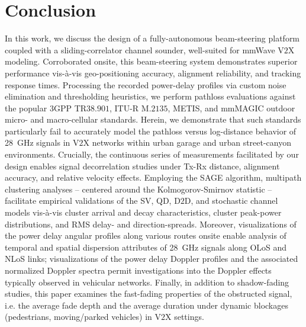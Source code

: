 \documentclass[12pt, draftcls, onecolumn]{IEEEtran}
\begin{document}
\section{Conclusion}\label{S6}
In this work, we discuss the design of a fully-autonomous beam-steering platform coupled with a sliding-correlator channel sounder, well-suited for mmWave V$2$X modeling. Corroborated onsite, this beam-steering system demonstrates superior performance vis-\`{a}-vis geo-positioning accuracy, alignment reliability, and tracking response times. Processing the recorded power-delay profiles via custom noise elimination and thresholding heuristics, we perform pathloss evaluations against the popular $3$GPP TR$38.901$, ITU-R M$.2135$, METIS, and mmMAGIC outdoor micro- and macro-cellular standards. Herein, we demonstrate that such standards particularly fail to accurately model the pathloss versus log-distance behavior of \SI{28}{\giga\hertz} signals in V$2$X networks within urban garage and urban street-canyon environments. Crucially, the continuous series of measurements facilitated by our design enables signal decorrelation studies under Tx-Rx distance, alignment accuracy, and relative velocity effects. Employing the SAGE algorithm, multipath clustering analyses -- centered around the Kolmogorov-Smirnov statistic -- facilitate empirical validations of the SV, QD, D$2$D, and stochastic channel models vis-\`{a}-vis cluster arrival and decay characteristics, cluster peak-power distributions, and RMS delay- and direction-spreads. Moreover, visualizations of the power delay angular profiles along various routes onsite enable analysis of temporal and spatial dispersion attributes of \SI{28}{\giga\hertz} signals along OLoS and NLoS links; visualizations of the power delay Doppler profiles and the associated normalized Doppler spectra permit investigations into the Doppler effects typically observed in vehicular networks. Finally, in addition to shadow-fading studies, this paper examines the fast-fading properties of the obstructed signal, i.e. the average fade depth and the average duration under dynamic blockages (pedestrians, moving/parked vehicles) in V$2$X settings.
\vspace{-3mm}


 
\end{document}
